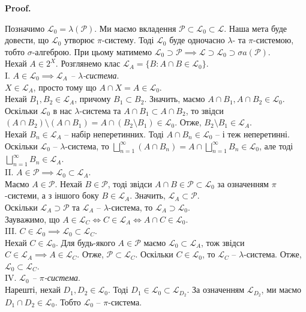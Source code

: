 \documentclass[a4paper, 10pt]{article}
\makeatletter
\theoremstyle{theoremdd}
\renewenvironment{proof}[1][Proof.\\]{\par
\pushQED{\hfill \qed}%
\normalfont \topsep6\p@\@plus6\p@\relax
\trivlist
\item\relax
{\bfseries
#1\@addpunct{.}}\hspace\labelsep\ignorespaces
}{%
\popQED\endtrivlist\@endpefalse
}
\makeatother
\begin{document}
\begin{proof}
Позначимо $\mathcal{L}_0 = \lambda(\mathcal{P})$. Ми маємо вкладення $\mathcal{P} \subset \mathcal{L}_0 \subset \mathcal{L}$. Наша мета буде довести, що $\mathcal{L}_0$ утворює $\pi$-систему. Тоді $\mathcal{L}_0$ буде одночасно $\lambda$- та $\pi$-системою, тобто $\sigma$-алгеброю. При цьому матимемо $\mathcal{L}_0 \supset \mathcal{P} \implies \mathcal{L} \supset \mathcal{L}_0 \supset \sigma a(\mathcal{P})$.
\bigskip \\
Нехай $A \in 2^X$. Розглянемо клас $\mathcal{L}_A = \{ B : A \cap B \in \mathcal{L}_0 \}$.\\
I. \textit{$A \in \mathcal{L}_0 \implies \mathcal{L}_A$ -- $\lambda$-система}.\\
$X \in \mathcal{L}_A$, просто тому що $A \cap X = A \in \mathcal{L}_0$.\\
Нехай $B_1,B_2 \in \mathcal{L}_A$, причому $B_1 \subset B_2$. Значить, маємо $A \cap B_1, A \cap B_2 \in \mathcal{L}_0$. Оскільки $\mathcal{L}_0$ в нас $\lambda$-система та $A \cap B_1 \subset A \cap B_2$, то звідси $(A \cap B_2) \setminus (A \cap B_1) = A \cap (B_2 \setminus B_1) \in \mathcal{L}_0$. Отже, $B_2 \setminus B_1 \in \mathcal{L}_A$.\\
Нехай $B_n \in \mathcal{L}_A$ -- набір неперетинних. Тоді $A \cap B_n \in \mathcal{L}_0$ -- і теж неперетинні. Оскільки $\mathcal{L}_0$ -- $\lambda$-система, то $\displaystyle\bigsqcup_{n=1}^\infty (A \cap B_n) = A \cap \bigsqcup_{n=1}^\infty B_n \in \mathcal{L}_0$, але тоді $\displaystyle\bigsqcup_{n=1}^\infty B_n \in \mathcal{L}_A$.
\bigskip \\
II. \textit{$A \in \mathcal{P} \implies \mathcal{L}_0 \subset \mathcal{L}_A$}.\\
Маємо $A \in \mathcal{P}$. Нехай $B \in \mathcal{P}$, тоді звідси $A \cap B \in \mathcal{P} \subset \mathcal{L}_0$ за означенням $\pi$-системи, а з іншого боку $B \in \mathcal{L}_A$. Значить, $\mathcal{L}_A \subset \mathcal{P}$.\\
Оскільки $\mathcal{L}_A \supset \mathcal{P}$ та $\mathcal{L}_A$ -- $\lambda$-система, то $\mathcal{L}_A \supset \mathcal{L}_0$.
\bigskip \\
Зауважимо, що $A \in \mathcal{L}_C \iff C \in \mathcal{L}_A \iff A \cap C \in \mathcal{L}_0$.
\bigskip \\
III. \textit{$C \in \mathcal{L}_0 \implies \mathcal{L}_0 \subset \mathcal{L}_C$}.\\
Нехай $C \in \mathcal{L}_0$. Для будь-якого $A \in \mathcal{P}$ маємо $\mathcal{L}_0 \subset \mathcal{L}_A$, тож звідси $C \in \mathcal{L}_A \implies A \in \mathcal{L}_C$. Отже, $\mathcal{P} \subset \mathcal{L}_C$. Оскільки $C \in \mathcal{L}_0$, то $\mathcal{L}_C$ -- $\lambda$-система. Отже, $\mathcal{L}_0 \subset \mathcal{L}_C$.
\bigskip \\
IV. \textit{$\mathcal{L}_0$ -- $\pi$-система}.\\
Нарешті, нехай $D_1,D_2 \in \mathcal{L}_0$. Тоді $D_1 \in \mathcal{L}_0 \subset \mathcal{L}_{D_2}$. За означенням $\mathcal{L}_{D_2}$, ми маємо $D_1 \cap D_2 \in \mathcal{L}_0$. Тобто $\mathcal{L}_0$ -- $\pi$-система.
\end{proof}
\newpage
\end{document}
